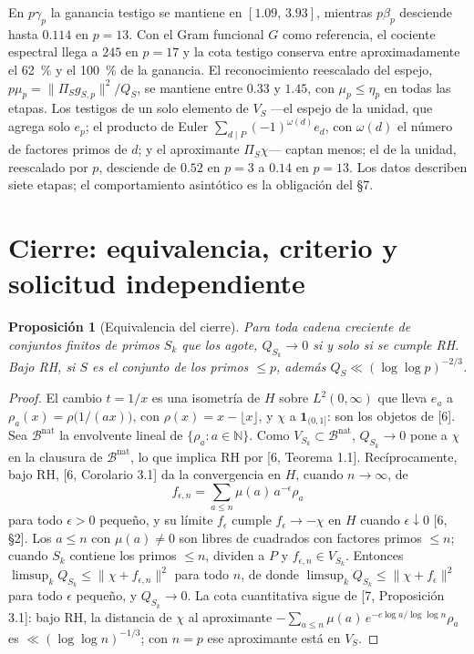 \documentclass[11pt,a4paper]{article}
\theoremstyle{plain}
\newtheorem{proposicion}{Proposición}
\begin{document}
En $p\gamma_p$ la ganancia testigo se mantiene en $[1.09,\,3.93]$, mientras $p\beta_p$ desciende hasta $0.114$ en $p=13$. Con el Gram funcional $G$ como referencia, el cociente espectral llega a $245$ en $p=17$ y la cota testigo conserva entre aproximadamente el 62~\% y el 100~\% de la ganancia. El reconocimiento reescalado del espejo, $p\mu_p=\|\Pi_Sg_{S,p}\|^2/Q_S$, se mantiene entre $0.33$ y $1.45$, con $\mu_p\le\eta_p$ en todas las etapas. Los testigos de un solo elemento de $V_S$ ---el espejo de la unidad, que agrega solo $e_p$; el producto de Euler $\sum_{d\mid P}(-1)^{\omega(d)}e_d$, con $\omega(d)$ el número de factores primos de $d$; y el aproximante $\Pi_S\chi$--- captan menos; el de la unidad, reescalado por $p$, desciende de $0.52$ en $p=3$ a $0.14$ en $p=13$. Los datos describen siete etapas; el comportamiento asintótico es la obligación del §7.

\section{Cierre: equivalencia, criterio y solicitud independiente}

\begin{proposicion}[Equivalencia del cierre]\label{prop:equiv}
Para toda cadena creciente de conjuntos finitos de primos $S_k$ que los agote, $Q_{S_k}\to0$ si y solo si se cumple RH. Bajo RH, si $S$ es el conjunto de los primos $\le p$, además $Q_S\ll(\log\log p)^{-2/3}$.
\end{proposicion}

\begin{proof}
El cambio $t=1/x$ es una isometría de $H$ sobre $L^2(0,\infty)$ que lleva $e_a$ a $\rho_a(x)=\rho\bigl(1/(ax)\bigr)$, con $\rho(x)=x-\lfloor x\rfloor$, y $\chi$ a $\mathbf 1_{(0,1]}$: son los objetos de [6]. Sea $\mathcal B^{\mathrm{nat}}$ la envolvente lineal de $\{\rho_a:a\in\mathbb N\}$. Como $V_{S_k}\subset\mathcal B^{\mathrm{nat}}$, $Q_{S_k}\to0$ pone a $\chi$ en la clausura de $\mathcal B^{\mathrm{nat}}$, lo que implica RH por [6, Teorema 1.1]. Recíprocamente, bajo RH, [6, Corolario 3.1] da la convergencia en $H$, cuando $n\to\infty$, de
\[
f_{\epsilon,n}=\sum_{a\le n}\mu(a)\,a^{-\epsilon}\rho_a
\]
para todo $\epsilon>0$ pequeño, y su límite $f_\epsilon$ cumple $f_\epsilon\to-\chi$ en $H$ cuando $\epsilon\downarrow0$ [6, §2]. Los $a\le n$ con $\mu(a)\neq0$ son libres de cuadrados con factores primos $\le n$; cuando $S_k$ contiene los primos $\le n$, dividen a $P$ y $f_{\epsilon,n}\in V_{S_k}$. Entonces $\limsup_k Q_{S_k}\le\|\chi+f_{\epsilon,n}\|^2$ para todo $n$, de donde $\limsup_kQ_{S_k}\le\|\chi+f_\epsilon\|^2$ para todo $\epsilon$ pequeño, y $Q_{S_k}\to0$. La cota cuantitativa sigue de [7, Proposición 3.1]: bajo RH, la distancia de $\chi$ al aproximante $-\sum_{a\le n}\mu(a)\,e^{-c\log a/\log\log n}\rho_a$ es $\ll(\log\log n)^{-1/3}$; con $n=p$ ese aproximante está en $V_S$.
\end{proof}
\end{document}
